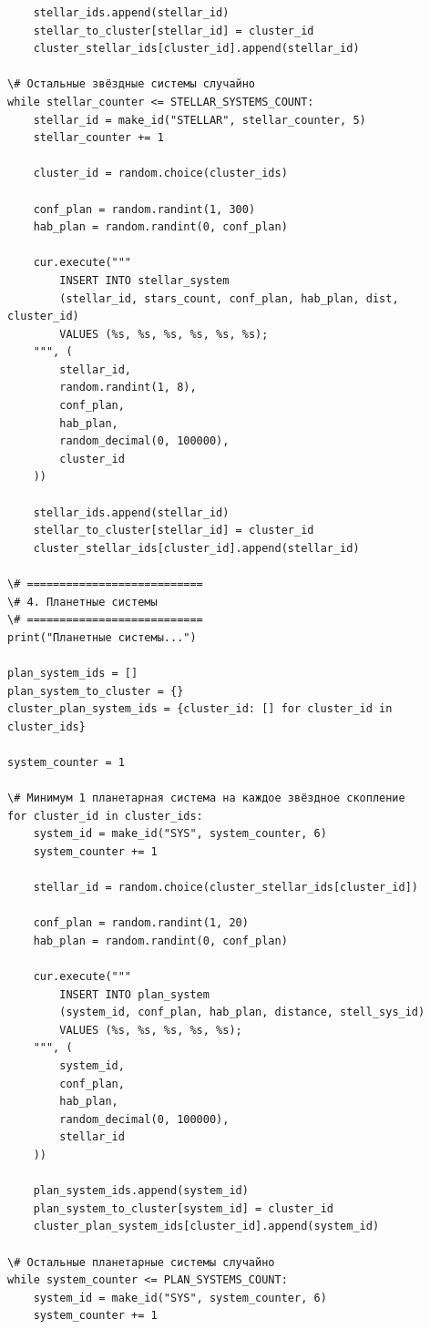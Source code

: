 \documentclass[14pt,a4paper]{extarticle}
\begin{document}
\begin{lstlisting}
    stellar_ids.append(stellar_id)
    stellar_to_cluster[stellar_id] = cluster_id
    cluster_stellar_ids[cluster_id].append(stellar_id)

\# Остальные звёздные системы случайно
while stellar_counter <= STELLAR_SYSTEMS_COUNT:
    stellar_id = make_id("STELLAR", stellar_counter, 5)
    stellar_counter += 1

    cluster_id = random.choice(cluster_ids)

    conf_plan = random.randint(1, 300)
    hab_plan = random.randint(0, conf_plan)

    cur.execute("""
        INSERT INTO stellar_system
        (stellar_id, stars_count, conf_plan, hab_plan, dist, cluster_id)
        VALUES (%s, %s, %s, %s, %s, %s);
    """, (
        stellar_id,
        random.randint(1, 8),
        conf_plan,
        hab_plan,
        random_decimal(0, 100000),
        cluster_id
    ))

    stellar_ids.append(stellar_id)
    stellar_to_cluster[stellar_id] = cluster_id
    cluster_stellar_ids[cluster_id].append(stellar_id)

\# ===========================
\# 4. Планетные системы
\# ===========================
print("Планетные системы...")

plan_system_ids = []
plan_system_to_cluster = {}
cluster_plan_system_ids = {cluster_id: [] for cluster_id in cluster_ids}

system_counter = 1

\# Минимум 1 планетарная система на каждое звёздное скопление
for cluster_id in cluster_ids:
    system_id = make_id("SYS", system_counter, 6)
    system_counter += 1

    stellar_id = random.choice(cluster_stellar_ids[cluster_id])

    conf_plan = random.randint(1, 20)
    hab_plan = random.randint(0, conf_plan)

    cur.execute("""
        INSERT INTO plan_system
        (system_id, conf_plan, hab_plan, distance, stell_sys_id)
        VALUES (%s, %s, %s, %s, %s);
    """, (
        system_id,
        conf_plan,
        hab_plan,
        random_decimal(0, 100000),
        stellar_id
    ))

    plan_system_ids.append(system_id)
    plan_system_to_cluster[system_id] = cluster_id
    cluster_plan_system_ids[cluster_id].append(system_id)

\# Остальные планетарные системы случайно
while system_counter <= PLAN_SYSTEMS_COUNT:
    system_id = make_id("SYS", system_counter, 6)
    system_counter += 1


\end{lstlisting}
\end{document}

